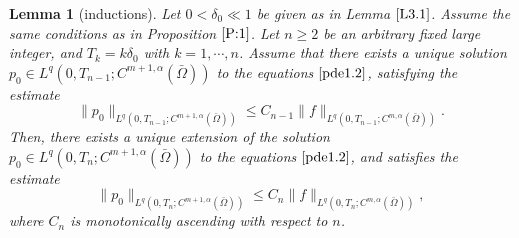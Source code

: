 \documentclass[13pt,CJK]{article}
\theoremstyle{plain}                       %
\newtheorem{lemma}{Lemma}[section]
\theoremstyle{remark}
\numberwithin{equation}{section}
\begin{document}
\begin{lemma}[inductions]\label{L3.2}
Let $0<\delta_0\ll 1$ be given as in Lemma $\ref{L3.1}$. Assume the same
conditions as in Proposition $\ref{P:1}$. Let $n\geq 2$ be an arbitrary fixed  large integer, and $T_k=k \delta_0$
with $k=1,\cdots,n$. Assume that there exists
a unique solution $p_0\in L^q(0,T_{n-1};C^{m+1,\alpha}(\bar\Omega))$ to the equations $\eqref{pde1.2}$,
satisfying the estimate
\begin{equation}\label{pri:3.3}
\|p_0\|_{L^q(0,T_{n-1};C^{m+1,\alpha}(\bar\Omega))}
\leq C_{n-1}
\|f\|_{L^q(0,T_{n-1};C^{m,\alpha}(\bar\Omega))}.
\end{equation}
Then, there exists a unique extension of the solution $p_0\in L^q(0,T_{n};C^{m+1,\alpha}(\bar\Omega))$ to the equations $\eqref{pde1.2}$,
and satisfies the estimate
\begin{equation}\label{pri:3.4}
\|p_0\|_{L^q(0,T_{n};C^{m+1,\alpha}(\bar\Omega))}
\leq C_{n}
\|f\|_{L^q(0,T_{n};C^{m,\alpha}(\bar\Omega))},
\end{equation}
where $C_n$ is monotonically ascending with respect to $n$.
\end{lemma}
\end{document}
